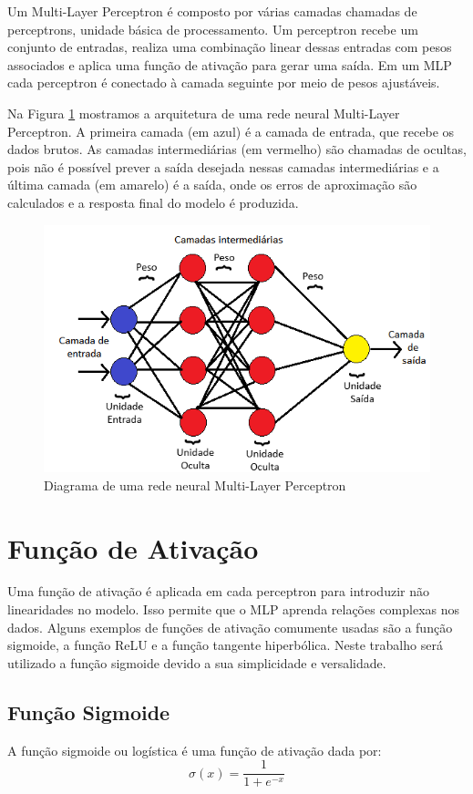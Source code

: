 \documentclass[12pt,a4paper,oneside]{report}
\newcommand{\fig}[1]{Figura \ref{#1}}
\begin{document}
	Um Multi-Layer Perceptron é composto por várias camadas chamadas de perceptrons, unidade básica de processamento. Um perceptron recebe um conjunto de entradas, realiza uma combinação linear dessas entradas com pesos associados e aplica uma função de ativação para gerar uma saída. Em um MLP cada perceptron é conectado à camada seguinte por meio de pesos ajustáveis\cite{tracker:2024}.  
	
	Na \fig{fig:camadas} mostramos a arquitetura de uma rede neural Multi-Layer Perceptron. A primeira camada (em azul) é a camada de entrada, que recebe os dados brutos. As camadas intermediárias (em vermelho) são chamadas de ocultas, pois não é possível prever a saída desejada nessas camadas intermediárias e a última camada (em amarelo) é a saída, onde os erros de aproximação são calculados e a resposta final do modelo é produzida\cite{moreira:2018}.
\begin{figure}[th!]
	\centering
	\includegraphics[width=0.6\linewidth]{img/camadas}
	\caption[Diagrama Multi-Layer Perceptron]{Diagrama de uma rede neural Multi-Layer Perceptron}
	\label{fig:camadas}
\end{figure}

	\section{Função de Ativação}
	Uma função de ativação é aplicada em cada perceptron para introduzir não linearidades no modelo. Isso permite que o MLP aprenda relações complexas nos dados. Alguns exemplos de funções de ativação comumente usadas são a função sigmoide, a função ReLU e a função tangente hiperbólica. Neste trabalho será utilizado a função sigmoide devido a sua simplicidade e versalidade.
	
	\subsection{Função Sigmoide}
	
	A função sigmoide ou logística é uma função de ativação dada por:
	\begin{equation}
		\sigma(x) = \frac{1}{1 + e^{-x}}
	\end{equation}
	
\end{document}
